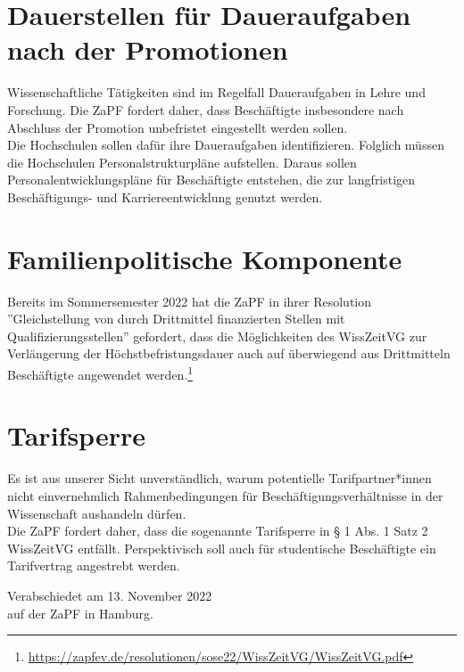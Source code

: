 \documentclass[DIV=calc]{scrartcl}
\begin{document}
\section{Dauerstellen für Daueraufgaben nach der Promotionen}
Wissenschaftliche Tätigkeiten sind im Regelfall Daueraufgaben in Lehre und Forschung. Die ZaPF fordert daher, dass Beschäftigte insbesondere nach Abschluss der Promotion unbefristet eingestellt werden sollen.\\
Die Hochschulen sollen dafür ihre Daueraufgaben identifizieren. Folglich müssen die Hochschulen Personalstrukturpläne aufstellen. Daraus sollen Personalentwicklungspläne für Beschäftigte entstehen, die zur langfristigen Beschäftigungs- und Karriereentwicklung genutzt werden.

\section{Familienpolitische Komponente}
Bereits im Sommersemester 2022 hat die ZaPF in ihrer Resolution ''Gleichstellung von durch Drittmittel finanzierten Stellen mit Qualifizierungsstellen'' gefordert, dass die Möglichkeiten des WissZeitVG zur Verlängerung der Höchstbefristungsdauer auch auf überwiegend aus Drittmitteln Beschäftigte angewendet werden.\footnote{\url{https://zapfev.de/resolutionen/sose22/WissZeitVG/WissZeitVG.pdf}}

\section{Tarifsperre}
Es ist aus unserer Sicht unverständlich, warum potentielle Tarifpartner*innen nicht einvernehmlich Rahmenbedingungen für Beschäftigungsverhältnisse in der Wissenschaft aushandeln dürfen.\\
Die ZaPF fordert daher, dass die sogenannte Tarifsperre in § 1 Abs. 1 Satz 2 WissZeitVG entfällt. Perspektivisch soll auch für studentische Beschäftigte ein Tarifvertrag angestrebt werden.






\vspace{1cm} 

\vfill
\begin{flushright}
	Verabschiedet am 13. November 2022 \\
	auf der ZaPF in Hamburg.
\end{flushright}
\end{document}
